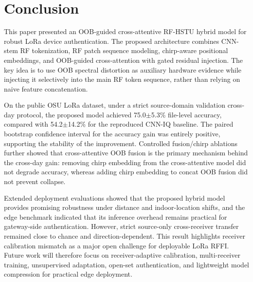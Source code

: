 \section{Conclusion}
\label{sec:conclusion}

This paper presented an OOB-guided cross-attentive RF-HSTU hybrid model for robust LoRa device authentication. The proposed architecture combines CNN-stem RF tokenization, RF patch sequence modeling, chirp-aware positional embeddings, and OOB-guided cross-attention with gated residual injection. The key idea is to use OOB spectral distortion as auxiliary hardware evidence while injecting it selectively into the main RF token sequence, rather than relying on naive feature concatenation.

On the public OSU LoRa dataset, under a strict source-domain validation cross-day protocol, the proposed model achieved 75.0$\pm$5.3\% file-level accuracy, compared with 54.2$\pm$14.2\% for the reproduced CNN-IQ baseline. The paired bootstrap confidence interval for the accuracy gain was entirely positive, supporting the stability of the improvement. Controlled fusion/chirp ablations further showed that cross-attentive OOB fusion is the primary mechanism behind the cross-day gain: removing chirp embedding from the cross-attentive model did not degrade accuracy, whereas adding chirp embedding to concat OOB fusion did not prevent collapse.

Extended deployment evaluations showed that the proposed hybrid model provides promising robustness under distance and indoor-location shifts, and the edge benchmark indicated that its inference overhead remains practical for gateway-side authentication. However, strict source-only cross-receiver transfer remained close to chance and direction-dependent. This result highlights receiver calibration mismatch as a major open challenge for deployable LoRa RFFI. Future work will therefore focus on receiver-adaptive calibration, multi-receiver training, unsupervised adaptation, open-set authentication, and lightweight model compression for practical edge deployment.

